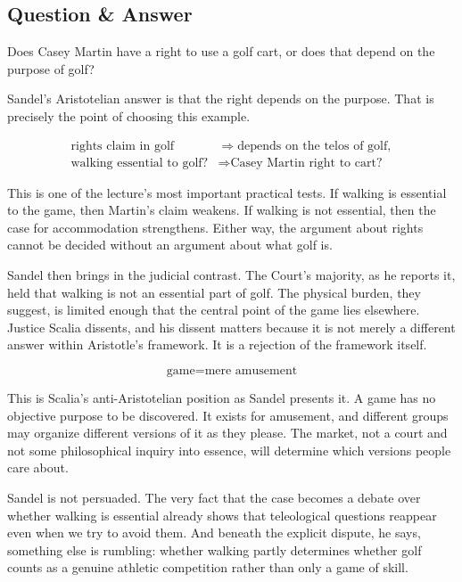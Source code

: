 \subsection{Question \& Answer}

Does Casey Martin have a right to use a golf cart, or does that depend on the purpose of golf?

Sandel's Aristotelian answer is that the right depends on the purpose. That is precisely the point of choosing this example.

\begin{align}
\text{rights claim in golf}
&\Longrightarrow
\text{depends on the telos of golf},\\
\text{walking essential to golf?}
&\Longrightarrow
\text{Casey Martin right to cart?}
\end{align}

This is one of the lecture's most important practical tests. If walking is essential to the game, then Martin's claim weakens. If walking is not essential, then the case for accommodation strengthens. Either way, the argument about rights cannot be decided without an argument about what golf is.

Sandel then brings in the judicial contrast. The Court's majority, as he reports it, held that walking is not an essential part of golf. The physical burden, they suggest, is limited enough that the central point of the game lies elsewhere. Justice Scalia dissents, and his dissent matters because it is not merely a different answer within Aristotle's framework. It is a rejection of the framework itself.

\begin{equation}
\text{game}=\text{mere amusement}
\end{equation}

This is Scalia's anti-Aristotelian position as Sandel presents it. A game has no objective purpose to be discovered. It exists for amusement, and different groups may organize different versions of it as they please. The market, not a court and not some philosophical inquiry into essence, will determine which versions people care about.

Sandel is not persuaded. The very fact that the case becomes a debate over whether walking is essential already shows that teleological questions reappear even when we try to avoid them. And beneath the explicit dispute, he says, something else is rumbling: whether walking partly determines whether golf counts as a genuine athletic competition rather than only a game of skill.

